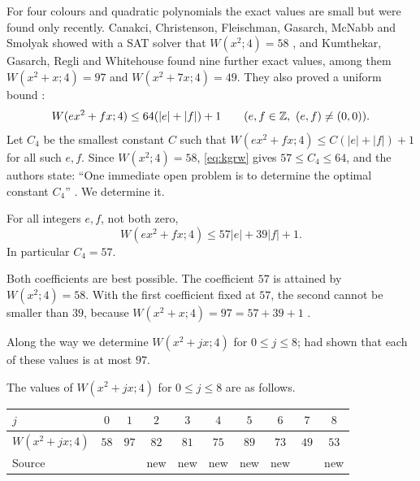 \documentclass[11pt,colorlinks]{charlie}
\begin{document}
For four colours and quadratic polynomials the exact values are small but were found only recently. Canakci, Christenson, Fleischman, Gasarch, McNabb and Smolyak showed with a SAT solver that $W(x^2;4)=58$ \cite{CCFGMS}, and Kumthekar, Gasarch, Regli and Whitehouse \cite{KGRW} found nine further exact values, among them $W(x^2+x;4)=97$ and $W(x^2+7x;4)=49$. They also proved a uniform bound \cite[Theorem~4.3]{KGRW}:
\begin{equation}\label{eq:kgrw}
W(ex^2+fx;4)\le64(|e|+|f|)+1\qquad(e,f\in\mathbb{Z},\ (e,f)\ne(0,0)).
\end{equation}
Let $C_4$ be the smallest constant $C$ such that $W(ex^2+fx;4)\le C(|e|+|f|)+1$ for all such $e,f$. Since $W(x^2;4)=58$, \eqref{eq:kgrw} gives $57\le C_4\le64$, and the authors state: ``One immediate open problem is to determine the optimal constant $C_4$'' \cite[Section~6]{KGRW}. We determine it.

\begin{theorem}\label{thm:main}
For all integers $e,f$, not both zero,
\[
W(ex^2+fx;4)\le57|e|+39|f|+1 .
\]
In particular $C_4=57$.
\end{theorem}

Both coefficients are best possible. The coefficient $57$ is attained by $W(x^2;4)=58$. With the first coefficient fixed at $57$, the second cannot be smaller than $39$, because $W(x^2+x;4)=97=57+39+1$ \cite[Theorem~2.3]{KGRW}.

Along the way we determine $W(x^2+jx;4)$ for $0\le j\le8$; \cite[Lemma~4.2]{KGRW} had shown that each of these values is at most $97$.

\begin{theorem}\label{thm:table}
The values of $W(x^2+jx;4)$ for $0\le j\le8$ are as follows.
\begin{center}
\begin{tabular}{@{}lccccccccc@{}}
\toprule
$j$ & $0$ & $1$ & $2$ & $3$ & $4$ & $5$ & $6$ & $7$ & $8$\\
\midrule
$W(x^2+jx;4)$ & $58$ & $97$ & $82$ & $81$ & $75$ & $89$ & $73$ & $49$ & $53$\\
Source & \cite{CCFGMS} & \cite{KGRW} & new & new & new & new & new & \cite{KGRW} & new\\
\bottomrule
\end{tabular}
\end{center}
\end{theorem}
\end{document}

